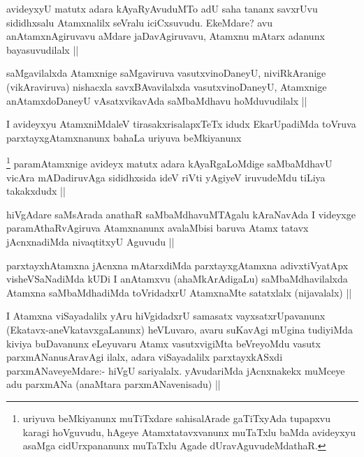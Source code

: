 \begin{artha}
avideyxyU matutx adara kAyaRyAvuduMTo adU saha tananx savxrUvu sididhxsalu Atamxnalilx seVralu iciCxsuvudu. EkeMdare? avu anAtamxnAgiruvavu aMdare jaDavAgiruvavu, Atamxnu mAtarx adanunx bayasuvudilalx ||
\end{artha}

\begin{artha}
saMgavilalxda Atamxnige saMgaviruva vasutxvinoDaneyU, niviRkAranige (vikAraviruva) nishacxla savxBAvavilalxda vasutxvinoDaneyU, Atamxnige anAtamxdoDaneyU vAsatxvikavAda saMbaMdhavu hoMduvudilalx ||
\end{artha}


\begin{artha}
I avideyxyu AtamxniMdaleV tirasakxrisalapxTeTx idudx EkarUpadiMda toVruva parxtayxgAtamxnanunx bahaLa uriyuva beMkiyanunx 
\end{artha}

\begin{artha}
\footnote{uriyuva beMkiyanunx muTiTxdare sahisalArade gaTiTxyAda tupapxvu karagi hoVguvudu, hAgeye Atamxtatavxvanunx muTaTxlu baMda avideyxyu asaMga cidUrxpananunx muTaTxlu Agade dUravAguvudeMdathaR.}
paramAtamxnige avideyx matutx adara kAyaRgaLoMdige saMbaMdhavU vicAra mADadiruvAga sididhxsida ideV riVti yAgiyeV iruvudeMdu tiLiya takakxdudx || 
\end{artha}

\begin{artha}
hiVgAdare saMsArada anathaR saMbaMdhavuMTAgalu kAraNavAda I videyxge paramAthaRvAgiruva Atamxnanunx avalaMbisi baruva Atamx tatavx jAcnxnadiMda nivaqtitxyU Aguvudu ||
\end{artha}

\begin{artha}
parxtayxhAtamxna jAcnxna mAtarxdiMda parxtayxgAtamxna adivxtiVyatApx visheVSaNadiMda kUDi I anAtamxvu (ahaMkArAdigaLu) saMbaMdhavilalxda Atamxna saMbaMdhadiMda toVridadxrU AtamxnaMte satatxlalx (nijavalalx) ||
\end{artha}


\begin{artha}
I Atamxna viSayadalilx yAru hiVgidadxrU samasatx vayxsatxrUpavanunx (Ekatavx-aneVkatavxgaLanunx) heVLuvaro, avaru suKavAgi mUgina tudiyiMda kiviya buDavanunx eLeyuvaru Atamx vasutxvigiMta beVreyoMdu vasutx parxmANanusAravAgi ilalx, adara viSayadalilx parxtayxkASxdi parxmANaveyeMdare:- hiVgU sariyalalx. yAvudariMda jAcnxnakekx muMceye adu parxmANa (anaMtara parxmANavenisadu) ||
\end{artha}

